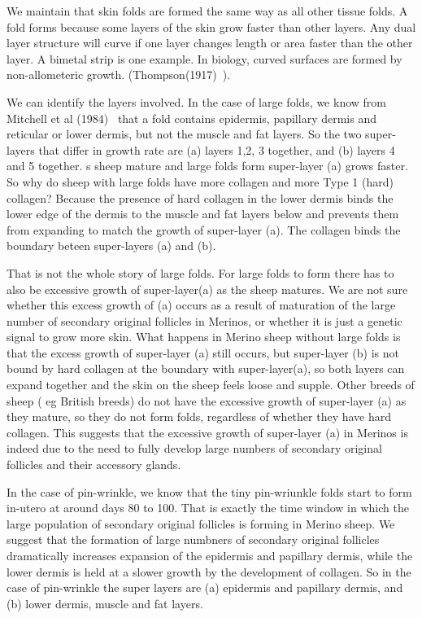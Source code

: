 \documentclass[titlepage]{article}  %
\begin{document}
We maintain that skin folds are formed the same way as all other tissue folds. A fold forms because some layers of the skin grow faster than other layers.  Any dual layer structure will curve if one layer changes length or area faster than the other layer. A bimetal strip is one example. In biology, curved surfaces are formed by non-allometeric growth. (Thompson(1917)~\cite{thom:17}).

We can identify the layers involved. In the case of large folds, we know from Mitchell et al (1984)~\cite{mitc:84} that a fold contains epidermis, papillary dermis and reticular or lower dermis, but not the muscle and fat layers.  So the two super-layers that differ in growth rate are (a) layers 1,2, 3 together, and (b) layers 4 and 5 together. s sheep mature and large folds form super-layer (a) grows faster.  So why do sheep with large folds have more collagen and more Type 1 (hard) collagen? Because the presence of hard collagen in the lower dermis binds the lower edge of the dermis to the muscle and fat layers below and prevents them from expanding to match the growth of super-layer (a). The collagen binds the boundary beteen super-layers (a) and (b).

That is not the whole story of large folds. For large folds to form there has to also be excessive growth of super-layer(a) as the sheep matures. We are not sure whether this excess growth of (a) occurs as a result of maturation of the large number of secondary original follicles in Merinos, or whether it is just a genetic signal to grow more skin. What happens in Merino sheep without large folds is that the excess growth of super-layer (a) still occurs, but super-layer (b)  is not bound by hard collagen at the boundary with super-layer(a), so both layers can expand together and the skin on the sheep feels loose and supple. Other breeds of sheep ( eg British breeds) do not have the excessive growth of super-layer (a) as they mature, so they do not form folds, regardless of whether they have hard collagen. This suggests that the excessive growth of super-layer (a) in Merinos is indeed due to the need to fully develop large numbers of secondary original follicles and their accessory glands. 

In the case of pin-wrinkle, we know that the tiny pin-wriunkle folds start to form in-utero at around days 80 to 100. That is exactly the time window in which the large population of secondary original follicles is forming in Merino sheep. We suggest that the formation of large numbners of secondary original follicles dramatically increases expansion of the epidermis and papillary dermis, while the lower dermis is held at a slower growth by the development of collagen. So in the case of pin-wrinkle the super layers are (a) epidermis and papillary dermis, and (b) lower dermis, muscle and fat layers.
\end{document}
